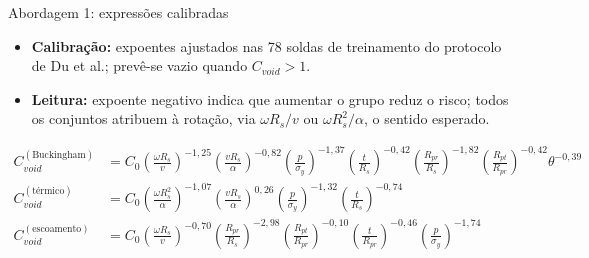 \documentclass[aspectratio=169,11pt]{beamer}
\newenvironment{bullets}{\begin{itemize}\setlength{\itemsep}{5pt}}{\end{itemize}}
\begin{document}
\begin{frame}{Abordagem 1: expressões calibradas}
\begin{bullets}
  \item \textbf{Calibração:} expoentes ajustados nas 78 soldas de treinamento do protocolo de Du et al.; prevê-se vazio quando $C_{void} > 1$.
  \item \textbf{Leitura:} expoente negativo indica que aumentar o grupo reduz o risco; todos os conjuntos atribuem à rotação, via $\omega R_s/v$ ou $\omega R_s^2/\alpha$, o sentido esperado.
\end{bullets}
\footnotesize
\begin{align*}
C_{void}^{(\text{Buckingham})} &= C_0 \left(\tfrac{\omega R_s}{v}\right)^{-1{,}25}\left(\tfrac{vR_s}{\alpha}\right)^{-0{,}82}\left(\tfrac{p}{\sigma_y}\right)^{-1{,}37}\left(\tfrac{t}{R_s}\right)^{-0{,}42}\left(\tfrac{R_{pr}}{R_s}\right)^{-1{,}82}\left(\tfrac{R_{pt}}{R_{pr}}\right)^{-0{,}42}\theta^{-0{,}39} \\[4pt]
C_{void}^{(\text{térmico})} &= C_0 \left(\tfrac{\omega R_{s}^{2}}{\alpha}\right)^{-1{,}07}\left(\tfrac{vR_s}{\alpha}\right)^{0{,}26}\left(\tfrac{p}{\sigma_y}\right)^{-1{,}32}\left(\tfrac{t}{R_s}\right)^{-0{,}74} \\[4pt]
C_{void}^{(\text{escoamento})} &= C_0 \left(\tfrac{\omega R_s}{v}\right)^{-0{,}70}\left(\tfrac{R_{pr}}{R_s}\right)^{-2{,}98}\left(\tfrac{R_{pt}}{R_{pr}}\right)^{-0{,}10}\left(\tfrac{t}{R_{pr}}\right)^{-0{,}46}\left(\tfrac{p}{\sigma_y}\right)^{-1{,}74}
\end{align*}
\end{frame}
\end{document}
